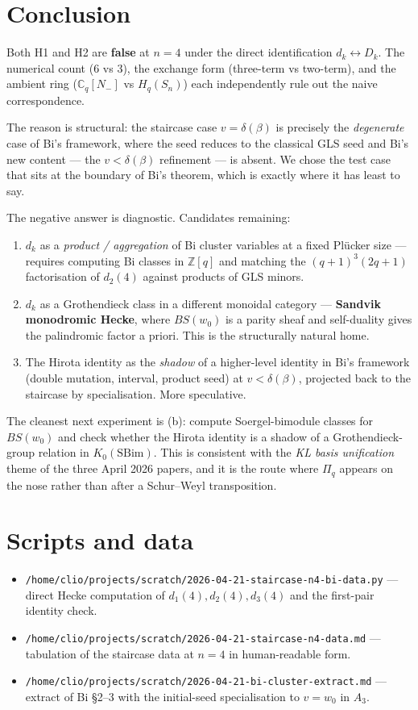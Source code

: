 \documentclass{article}
\theoremstyle{definition}
\theoremstyle{remark}
\begin{document}
\section{Conclusion}

Both H1 and H2 are \textbf{false} at $n=4$ under the direct identification $d_k \leftrightarrow D_k$. The numerical count (6 vs 3), the exchange form (three-term vs two-term), and the ambient ring ($\mathbb{C}_q[N_-]$ vs $H_q(S_n)$) each independently rule out the naive correspondence.

The reason is structural: the staircase case $v = \delta(\beta)$ is precisely the \emph{degenerate} case of Bi's framework, where the seed reduces to the classical GLS seed and Bi's new content --- the $v < \delta(\beta)$ refinement --- is absent. We chose the test case that sits at the boundary of Bi's theorem, which is exactly where it has least to say.

The negative answer is diagnostic. Candidates remaining:
\begin{enumerate}
\item[(a)] $d_k$ as a \emph{product / aggregation} of Bi cluster variables at a fixed Pl\"ucker size --- requires computing Bi classes in $\mathbb{Z}[q]$ and matching the $(q+1)^3(2q+1)$ factorisation of $d_2(4)$ against products of GLS minors.
\item[(b)] $d_k$ as a Grothendieck class in a different monoidal category --- \textbf{Sandvik monodromic Hecke}, where $BS(w_0)$ is a parity sheaf and self-duality gives the palindromic factor a priori. This is the structurally natural home.
\item[(c)] The Hirota identity as the \emph{shadow} of a higher-level identity in Bi's framework (double mutation, interval, product seed) at $v < \delta(\beta)$, projected back to the staircase by specialisation. More speculative.
\end{enumerate}

The cleanest next experiment is (b): compute Soergel-bimodule classes for $BS(w_0)$ and check whether the Hirota identity is a shadow of a Grothendieck-group relation in $K_0(\text{SBim})$. This is consistent with the \emph{KL basis unification} theme of the three April 2026 papers, and it is the route where $\Pi_q$ appears on the nose rather than after a Schur--Weyl transposition.

\appendix
\section{Scripts and data}

\begin{itemize}
\item \verb|/home/clio/projects/scratch/2026-04-21-staircase-n4-bi-data.py| --- direct Hecke computation of $d_1(4), d_2(4), d_3(4)$ and the first-pair identity check.
\item \verb|/home/clio/projects/scratch/2026-04-21-staircase-n4-data.md| --- tabulation of the staircase data at $n=4$ in human-readable form.
\item \verb|/home/clio/projects/scratch/2026-04-21-bi-cluster-extract.md| --- extract of Bi \S 2--3 with the initial-seed specialisation to $v = w_0$ in $A_3$.
\end{itemize}
\end{document}
